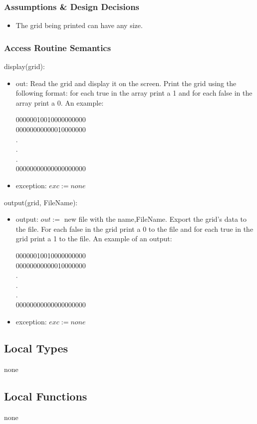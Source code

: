 \documentclass[12pt]{article}
\begin{document}
\subsubsection* {Assumptions \& Design Decisions}

\begin{itemize}
\item The grid being printed can have any size.
\end{itemize}

\subsubsection* {Access Routine Semantics}

\noindent display(grid):
\begin{itemize}
\item out: Read the grid and display it on the screen. Print the grid using the following format:
for each true in the array print a 1 and for each false in the array print a 0.
An example:
\begin{center}
    00000010010000000000\\
    00000000000010000000\\
    .\\
    .\\
    .\\
    00000000000000000000\\
\end{center}
\item exception: $exc := none$ 
\end{itemize}

\noindent output(grid, FileName):
\begin{itemize}
    \item output: $out :=$ new file with the name,FileName. Export the grid's data to the file. For each false in the grid print a 0 to the file and for each true in the grid print a 1 to the file. An example of an output:
    \begin{center}
        00000010010000000000\\
        00000000000010000000\\
        .\\
        .\\
        .\\
        00000000000000000000\\
    \end{center}
    \item exception: $exc := none$
\end{itemize}

\subsection*{Local Types}
none
\subsection*{Local Functions}
none
 
\end{document}
